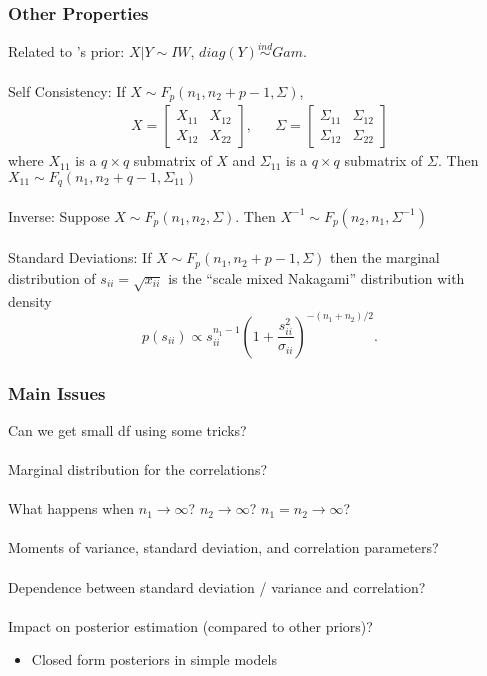\documentclass[xcolor=dvipsnames]{beamer}
\begin{document}
\begin{frame}
\frametitle{Other Properties}
Related to \citet{huang2013simple}'s prior: $X|Y\sim IW$, $diag(Y)\stackrel{ind}{\sim} Gam$.\\~\\
\pause
Self Consistency: If $X\sim F_p(n_1, n_2 + p - 1, \Sigma)$,
\begin{align*}
  X = \begin{bmatrix} X_{11} & X_{12} \\ X_{12} & X_{22} \end{bmatrix}, &&   \Sigma = \begin{bmatrix} \Sigma_{11} & \Sigma_{12} \\ \Sigma_{12} & \Sigma_{22} \end{bmatrix}
\end{align*}
where $X_{11}$ is a $q\times q$ submatrix of $X$ and $\Sigma_{11}$ is a $q\times q$ submatrix of $\Sigma$. Then $X_{11} \sim F_q(n_1, n_2 + q - 1, \Sigma_{11})$ \\~\\
\pause
Inverse: Suppose $X\sim F_p(n_1, n_2, \Sigma)$. Then $X^{-1}\sim F_p(n_2, n_1, \Sigma^{-1})$\\~\\
\pause
Standard Deviations: If $X\sim F_p(n_1, n_2 + p - 1, \Sigma)$ then the marginal distribution of $s_{ii}=\sqrt{x_{ii}}$ is the ``scale mixed Nakagami'' distribution with density
\[
p(s_{ii})\propto s_{ii}^{n_1 - 1}\left(1 + \frac{s_{ii}^2}{\sigma_{ii}}\right)^{-(n_1 + n_2)/2}.
\]

\end{frame}

\begin{frame}
\frametitle{Main Issues}
Can we get small df using some tricks?\\~\\
\pause
Marginal distribution for the correlations?\\~\\
\pause
What happens when $n_1\to \infty$? $n_2\to \infty$? $n_1=n_2\to \infty$?\\~\\
\pause
Moments of variance, standard deviation, and correlation parameters?\\~\\
\pause
Dependence between standard deviation / variance and correlation?\\~\\
\pause
Impact on posterior estimation (compared to other priors)?\\
\pause
\begin{itemize}
\item[] Closed form posteriors in simple models
\end{itemize}
\end{frame}
\end{document}
